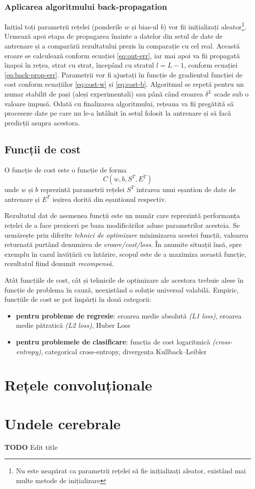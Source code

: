 \subsubsection*{Aplicarea algoritmului back-propagation}
Inițial toți parametrii rețelei (ponderile $w$ și bias-ul $b$) vor fii inițializați aleator\footnote{Nu este neapărat ca parametrii rețelei să fie inițializați aleator, existând mai multe metode de inițializare}. Urmează apoi etapa de propagarea înainte a datelor din setul de date de antrenare și a comparării rezultatului prezis în comparație cu cel real. Această eroare se calculează conform ecuației \eqref{eq:out-err}, iar mai apoi va fii propagată înapoi în rețea, strat cu strat, începând cu stratul $l = L-1$, conform ecuației \eqref{eq:back-prop-err}. Parametrii vor fi ajustați în funcție de gradientul funcției de cost conform ecuațiilor \eqref{eq:cost-w} și \eqref{eq:cost-b}. Algoritmul se repetă pentru un numar stabilit de pași (aleși experimentali) sau până când eroarea $\delta^L$ scade sub o valoare impusă. Odată cu finalizarea algoritmului, rețeaua va fii pregătită să proceseze date pe care nu le-a întâlnit în setul folosit la antrenare și să facă predicții asupra acestora.

\subsection{Funcții de cost}\label{subch:f-cost}
O funcție de cost este o funcție de forma \cite{neuralnetbook:2015}
\begin{equation}
C(w,b,S^T,E^T)
\label{eq:cost-form}
\end{equation}
unde $w$ și $b$ reprezintă parametrii rețelei $S^T$ intrarea unui eșantion de date de antrenare și $E^T$ ieșirea dorită din eșantionul respectiv.

Rezultatul dat de asemenea funcții este un număr care reprezintă performanța rețelei de a face preziceri pe baza modificărilor aduse parametrilor acesteia. Se urmărește prin diferite \textit{tehnici de optimizare} minimizarea acestei funcții, valoarea returnată purtând denumirea de \textit{eroare/cost/loss}. În anumite situații însă, spre exemplu în cazul învățării cu întărire, scopul este de a maximiza această funcție, rezultatul fiind denumit \textit{recompensă}.

Atât funcțiile de cost, cât și tehnicile de optimizare ale acestora trebuie alese în funcție de problema în cauză, neexistând o soluție universal valabilă. Empiric, funcțiile de cost se pot împărți în două categorii:
\begin{itemize}
\item \textbf{pentru probleme de regresie}: eroarea medie absolută \textit{(L1 loss)}, eroarea medie pătratică \textit{(L2 loss)},  Huber Loss
\item \textbf{pentru problemele de clasificare}: funcția de cost logaritmică \textit{(cross-entropy)}, categorical cross-entropy, divergența Kullback–Leibler
\end{itemize}

\section{Rețele convoluționale}


\section{Undele cerebrale}
\textbf{TODO} Edit title